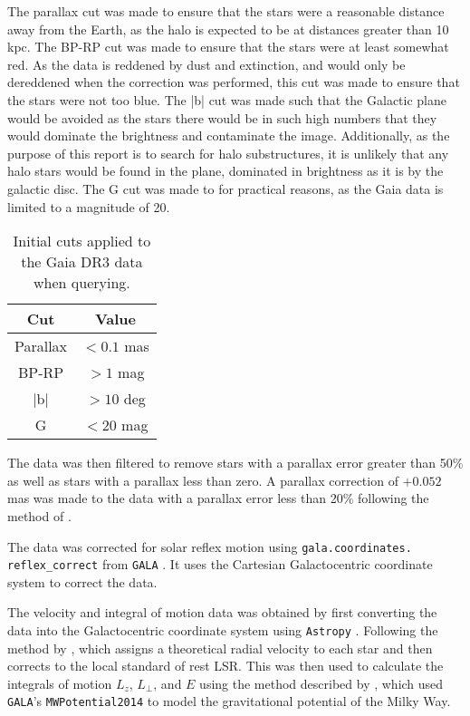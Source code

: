 \documentclass[11pt,a4paper]{article}
\begin{document}
The parallax cut was made to ensure that the stars were a reasonable distance away from the Earth, as the halo is expected to be at distances greater than 10 kpc. The BP-RP cut was made to ensure that the stars were at least somewhat red. As the data is reddened by dust and extinction, and would only be dereddened when the correction was performed, this cut was made to ensure that the stars were not too blue. The |b| cut was made such that the Galactic plane would be avoided as the stars there would be in such high numbers that they would dominate the brightness and contaminate the image. Additionally, as the purpose of this report is to search for halo substructures, it is unlikely that any halo stars would be found in the plane, dominated in brightness as it is by the galactic disc. The G cut was made to for practical reasons, as the Gaia data is limited to a magnitude of 20.

\begin{table}[h]
    \centering
    \begin{tabular}{c|c}
    Cut & Value \\
    \hline
    Parallax & $< 0.1$ mas \\
    BP-RP & $> 1$ mag \\
    |b| & $> 10$ deg \\
    G & $< 20$ mag \\
    \hline
    \end{tabular}
    \caption{Initial cuts applied to the Gaia DR3 data when querying.}
    \label{tab:query_cuts}
\end{table}

The data was then filtered to remove stars with a parallax error greater than 50\% as well as stars with a parallax less than zero. A parallax correction of $+0.052$ mas was made to the data with a parallax error less than 20\% following the method of \citet{10.1093/mnras/stz3479}.

The data was corrected for solar reflex motion using \texttt{gala.coordinates. reflex\_correct} from \texttt{GALA} \citep{gala,adrian_price_whelan_2020_4159870}. It uses the Cartesian Galactocentric coordinate system to correct the data.

The velocity and integral of motion data was obtained by first converting the data into the Galactocentric coordinate system using \texttt{Astropy} \citep{astropy:2013,astropy:2018,astropy:2022}. Following the method by \citeauthor{2023A&A...679A.109C}, which assigns a theoretical radial velocity to each star and then corrects to the local standard of rest LSR. This was then used to calculate the integrals of motion $L_z$, $L_\bot$, and $E$ using the method described by \citeauthor{10.1093/mnras/stz3479}, which used \texttt{GALA}'s \texttt{MWPotential2014} to model the gravitational potential of the Milky Way.
\end{document}
